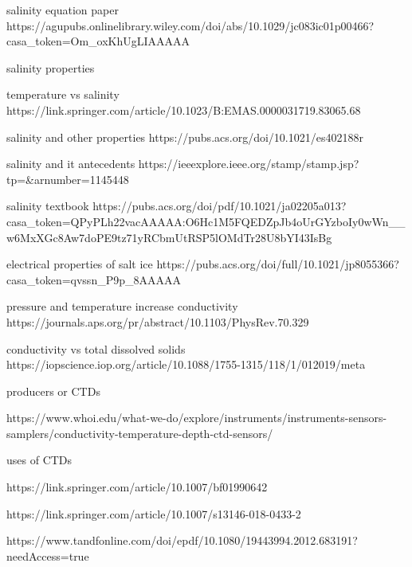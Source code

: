 salinity equation paper https://agupubs.onlinelibrary.wiley.com/doi/abs/10.1029/jc083ic01p00466?casa_token=Om_oxKhUgLIAAAAA%

salinity properties

temperature vs salinity https://link.springer.com/article/10.1023/B:EMAS.0000031719.83065.68

salinity and other properties https://pubs.acs.org/doi/10.1021/es402188r

salinity and it antecedents https://ieeexplore.ieee.org/stamp/stamp.jsp?tp=&arnumber=1145448

salinity textbook https://pubs.acs.org/doi/pdf/10.1021/ja02205a013?casa_token=QPyPLh22vacAAAAA:O6Hc1M5FQEDZpJb4oUrGYzboIy0wWn__w6MxXGc8Aw7doPE9tz71yRCbmUtRSP5lOMdTr28U8bYI43IsBg

electrical properties of salt ice https://pubs.acs.org/doi/full/10.1021/jp8055366?casa_token=qvssn_P9p_8AAAAA%

pressure and temperature increase conductivity https://journals.aps.org/pr/abstract/10.1103/PhysRev.70.329

conductivity vs total dissolved solids https://iopscience.iop.org/article/10.1088/1755-1315/118/1/012019/meta

producers or CTDs

https://www.whoi.edu/what-we-do/explore/instruments/instruments-sensors-samplers/conductivity-temperature-depth-ctd-sensors/

uses of CTDs

https://link.springer.com/article/10.1007/bf01990642

https://link.springer.com/article/10.1007/s13146-018-0433-2

https://www.tandfonline.com/doi/epdf/10.1080/19443994.2012.683191?needAccess=true